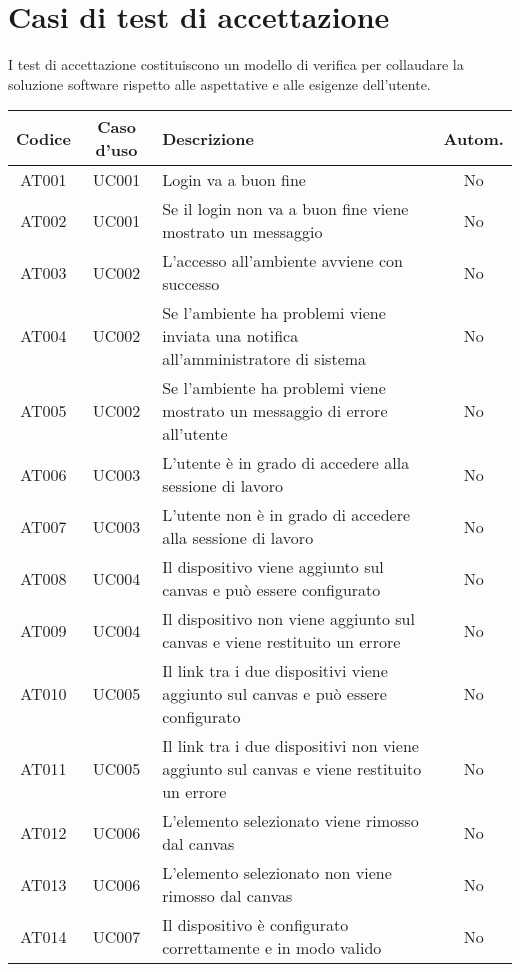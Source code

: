 \documentclass[../main.tex]{subfiles}
\begin{document}
\chapter{Casi di test di accettazione}
I test di accettazione costituiscono un modello di verifica per collaudare la soluzione software rispetto alle aspettative e alle esigenze dell'utente.
\clearpage

\begin{tabularx}{\linewidth}{|c|c|X|c|}
    \toprule
    \textbf{Codice}      & \textbf{Caso d'uso}        & \textbf{Descrizione} & \textbf{Autom.} \\ 
    \midrule
    \endhead
    AT001       & UC001    & Login va a buon fine & No \\ \hline
    AT002       & UC001    & Se il login non va a buon fine viene mostrato un messaggio & No \\ \hline
    AT003       & UC002    & L'accesso all'ambiente avviene con successo & No \\ \hline
    AT004       & UC002    & Se l'ambiente ha problemi viene inviata una notifica all'amministratore di sistema & No \\ \hline
    AT005       & UC002    & Se l'ambiente ha problemi viene mostrato un messaggio di errore all'utente & No \\ \hline
    AT006       & UC003    & L'utente è in grado di accedere alla sessione di lavoro & No \\ \hline
    AT007       & UC003    & L'utente non è in grado di accedere alla sessione di lavoro & No \\ \hline
    AT008       & UC004    & Il dispositivo viene aggiunto sul canvas e può essere configurato & No \\ \hline
    AT009       & UC004    & Il dispositivo non viene aggiunto sul canvas e viene restituito un errore & No \\ \hline
    AT010       & UC005    & Il link tra i due dispositivi viene aggiunto sul canvas e può essere configurato & No \\ \hline
    AT011       & UC005    & Il link tra i due dispositivi non viene aggiunto sul canvas e viene restituito un errore & No \\ \hline
    AT012       & UC006    & L'elemento selezionato viene rimosso dal canvas & No \\ \hline
    AT013       & UC006    & L'elemento selezionato non viene rimosso dal canvas & No \\ \hline
    AT014       & UC007    & Il dispositivo è configurato correttamente e in modo valido & No \\ \hline

\end{tabularx}
\end{document}
